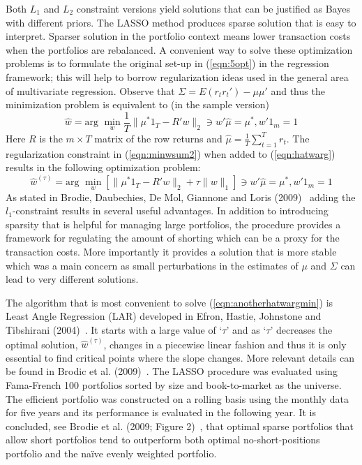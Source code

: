 Both $L_1$ and $L_2$ constraint versions yield solutions that can be justified as Bayes with different priors. The LASSO method produces sparse solution that is easy to interpret. Sparser solution in the portfolio context means lower transaction costs when the portfolios are rebalanced. A convenient way to solve these optimization problems is to formulate the original set-up in (\ref{eqn:5opt}) in the regression framework; this will help to borrow regularization ideas used in the general area of multivariate regression. Observe that $\Sigma=E(r_tr_t') - \mu\mu'$ and thus the minimization problem is equivalent to (in the sample version)
	\begin{equation}\label{eqn:hatwarg}
	\hat{w}= \text{arg }\min_w \dfrac{1}{T} \| \mu^*1_T - R'w\|_2 \ni w'\hat{\mu} = \mu^*, w'1_m=1
	\end{equation}
Here $R$ is the $m\times T$ matrix of the row returns and $\hat{\mu}=\frac{1}{T}\sum_{t=1}^T r_t$. The regularization constraint in (\ref{eqn:minwsum2}) when added to (\ref{eqn:hatwarg}) results in the following optimization problem:
	\begin{equation}\label{eqn:anotherhatwargmin}
	\hat{w}^{(\tau)}= \text{arg } \min_w [ \|\mu^* 1_T - R'w\|_2 + \tau\|w\|_1] \ni w' \hat{\mu} = \mu^*, w'1_m=1
	\end{equation}
As stated in Brodie, Daubechies, De Mol, Giannone and Loris (2009)~\cite{brodic} adding the $l_1$-constraint results in several useful advantages. In addition to introducing sparsity that is helpful for managing large portfolios, the procedure provides a framework for regulating the amount of shorting which can be a proxy for the transaction costs. More importantly it provides a solution that is more stable which was a main concern as small perturbations in the estimates of $\mu$ and $\Sigma$ can lead to very different solutions.


The algorithm that is most convenient to solve (\ref{eqn:anotherhatwargmin}) is Least Angle Regression (LAR) developed in Efron, Hastie, Johnstone and Tibshirani (2004)~\cite{efron}. It starts with a large value of `$\tau$' and as `$\tau$' decreases the optimal solution, $\hat{w}^{(\tau)}$, changes in a piecewise linear fashion and thus it is only essential to find critical points where the slope changes. More relevant details can be found in Brodic et al. (2009)~\cite{brodic}. The LASSO procedure was evaluated using Fama-French 100 portfolios sorted by size and book-to-market as the universe. The efficient portfolio was constructed on a rolling basis using the monthly data for five years and its performance is evaluated in the following year. It is concluded, see Brodie et al. (2009; Figure 2)~\cite{brodic}, that optimal sparse portfolios that allow short portfolios tend to outperform both optimal no-short-positions portfolio and the na\"ive evenly weighted portfolio. 



